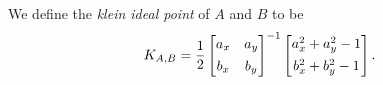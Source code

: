 We define the \emph{klein ideal point} of \(A\) and \(B\) to be \[ K_{A,B} = \frac{1}{2} \begin{bmatrix} a_x & a_y \\[4pt] b_x & b_y \end{bmatrix}^{-1} \begin{bmatrix} a_x^2 + a_y^2 - 1 \\[4pt] b_x^2 + b_y^2 - 1 \end{bmatrix}. \]
